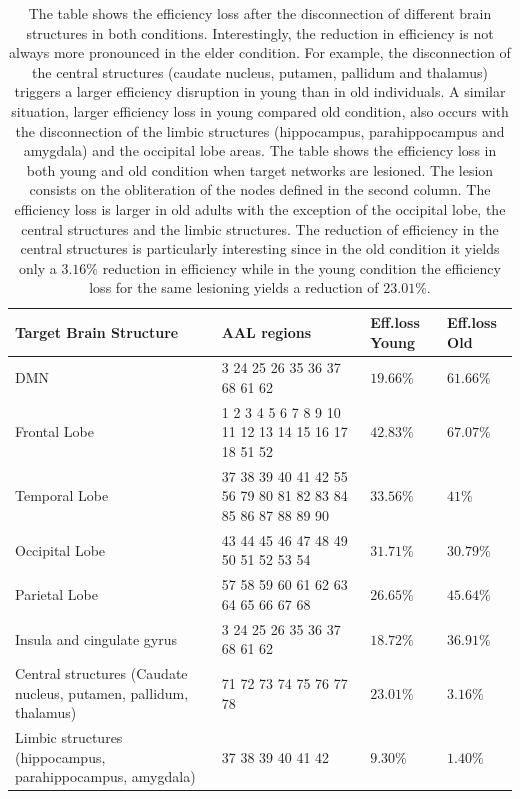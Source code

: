 \documentclass[12pt,a4paper]{article}
\begin{document}
\begin{table}[!htbp]
\centering%

\newpage
\begin{tabularx}{\linewidth}{XXXX}
\toprule
Target Brain Structure & AAL regions & Eff.loss Young &Eff.loss Old\\
\midrule
\midrule
DMN & 3 24 25 26 35 36 37 68 61 62 & $19.66\%$& $61.66\%$\\
\midrule
Frontal Lobe & 1 2 3 4 5 6 7 8 9 10 11 12 13 14 15 16 17 18 51 52 & $42.83\%$& $67.07\%$\\
\midrule
  Temporal Lobe & 37 38 39 40 41 42 55 56 79 80 81 82 83 84 85 86 87 88 89 90 & $33.56\%$& $41\%$\\
      \midrule
      Occipital Lobe & 43 44 45 46 47 48 49 50 51 52 53 54 & $31.71\%$& $30.79\%$\\
	 \midrule      
	 Parietal Lobe & 57 58 59 60 61 62 63 64 65 66 67 68 & $26.65\%$& $45.64\%$\\
	\midrule      
	Insula and cingulate gyrus & 3 24 25 26 35 36 37 68 61 62 & $18.72\%$& $36.91\%$\\
   \midrule     
    Central structures (Caudate nucleus, putamen, pallidum, thalamus) & 71 72 73 74 75 76 77 78 & $23.01\%$& $3.16\%$\\
     \midrule 
     Limbic structures (hippocampus, parahippocampus, amygdala) & 37 38 39 40 41 42 & $9.30\%$& $1.40\%$\\
     \bottomrule
\end{tabularx}
\caption{The table shows the efficiency loss after the disconnection of different brain structures in both conditions. Interestingly, the reduction in efficiency is not always more pronounced in the elder condition. For example, the disconnection of the central structures (caudate nucleus, putamen, pallidum and thalamus) triggers a larger efficiency disruption in young than in old individuals. A similar situation, larger efficiency loss in young compared old condition, also occurs with the disconnection of the limbic structures (hippocampus, parahippocampus and amygdala) and the occipital lobe areas. The table shows the efficiency loss in both young and old condition when target networks are lesioned. The lesion consists on the obliteration of the nodes defined in the second column. The efficiency loss is larger in old adults with the exception of the occipital lobe, the central structures and the limbic structures. The reduction of efficiency in the central structures is particularly interesting since in the old condition it yields only a $3.16\%$ reduction in efficiency while in the young condition the efficiency loss for the same lesioning yields a reduction of $23.01\%$.}
\label{tab:nodesn}
\end{table}
\end{document}
